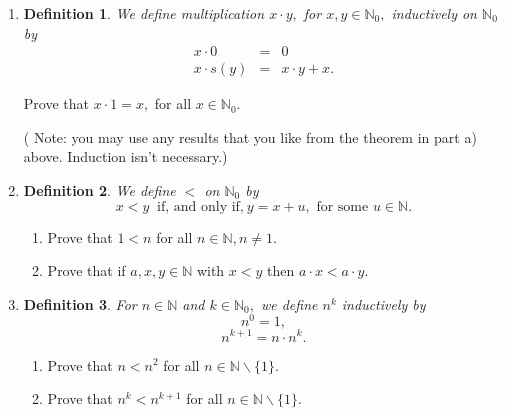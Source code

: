 \documentclass[11pt]{article}
\newcommand{\bbN}{\mathbb{N}}
\newtheorem*{definition}{Definition}
\begin{document}
\begin{enumerate}
\begin{enumerate}
 \begin{proof}  The proof of each part involves induction. Try it! 
 \end{proof}
 
 \item 
 \begin{definition}
 We define multiplication $x\cdot y,$ for $x,y\in \bbN_0,$ inductively on $\bbN_0$ by
 \begin{eqnarray*}
 x\cdot 0 & = & 0\\
 x\cdot s(y) & = & x\cdot y + x.
 \end{eqnarray*}
 \end{definition}
 

 
 Prove that $x\cdot 1=x,$ for all $x\in \bbN_0.$
 
( Note: you may use any results that you like from the theorem in part a) above.  Induction isn't necessary.)

 
\item
 
 \begin{definition}
 We define $<$ on $\bbN_0$ by 
 $$x<y\ \text{ if, and only if,}\  y=x+u,\text{ for some }u\in\bbN.$$
 \end{definition}
 \begin{enumerate}
	\item Prove that $1<n$ for all $n\in\bbN, n\neq 1.$
	\item Prove that if $a, x, y\in\bbN$ with $x < y$ then $a\cdot x < a \cdot y$.
\end{enumerate}

\item

\begin{definition}
For $n\in \bbN$ and $k\in\bbN_0,$ we define $n^k$ inductively by
\[n^0=1,\]
\[n^{k+1}=n\cdot n^k.\]
\end{definition}
 

\begin{enumerate}
\item Prove that $n<n^2$ for all $n\in\bbN\backslash\{1\}.$  
\item Prove that $n^k<n^{k+1}$ for all $n\in\bbN\backslash\{1\}.$
\end{enumerate}




\end{enumerate}
 
 \end{enumerate}
\end{document}

